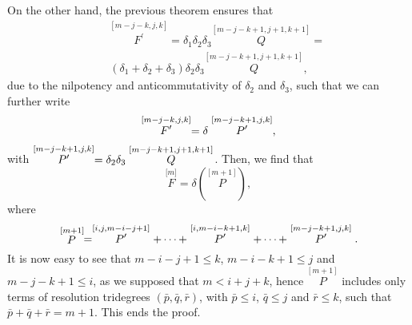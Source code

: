 \documentclass[a4paper,12pt]{article}
\begin{document}
On the other hand, the previous theorem ensures that 
\begin{eqnarray}
&&\stackrel{[m-j-k,j,k]}{F^{\prime }}=\delta _{1}\delta _{2}\delta _{3}%
\stackrel{[m-j-k+1,j+1,k+1]}{Q}=  \nonumber \\
&&\left( \delta _{1}+\delta _{2}+\delta _{3}\right) \delta _{2}\delta _{3}%
\stackrel{[m-j-k+1,j+1,k+1]}{Q},  \label{sp3.ap61}
\end{eqnarray}
due to the nilpotency and anticommutativity of $\delta _{2}$ and $\delta
_{3} $, such that we can further write 
\begin{equation}
\stackrel{\lbrack m-j-k,j,k]}{F^{\prime }}=\delta \stackrel{[m-j-k+1,j,k]}{%
P^{\prime }},  \label{sp3.ap62}
\end{equation}
with $\stackrel{[m-j-k+1,j,k]}{P^{\prime }}=\delta _{2}\delta _{3}\stackrel{%
[m-j-k+1,j+1,k+1]}{Q}$. Then, we find that 
\begin{equation}
\stackrel{\lbrack m]}{F}=\delta \left( \stackrel{[m+1]}{P}\right) ,
\label{sp3.ap63}
\end{equation}
where 
\begin{equation}
\stackrel{\lbrack m+1]}{P}=\stackrel{[i,j,m-i-j+1]}{P^{\prime }}+\cdots +%
\stackrel{[i,m-i-k+1,k]}{P^{\prime }}+\cdots +\stackrel{[m-j-k+1,j,k]}{%
P^{\prime }}.  \label{sp3.ap64}
\end{equation}
It is now easy to see that $m-i-j+1\leq k$, $m-i-k+1\leq j$ and $m-j-k+1\leq
i$, as we supposed that $m<i+j+k$, hence $\stackrel{[m+1]}{P}$ includes only
terms of resolution tridegrees $\left( \bar{p},\bar{q},\bar{r}\right) $,
with $\bar{p}\leq i$, $\bar{q}\leq j$ and $\bar{r}\leq k$, such that $\bar{p}%
+\bar{q}+\bar{r}=m+1$. This ends the proof.
\end{document}
